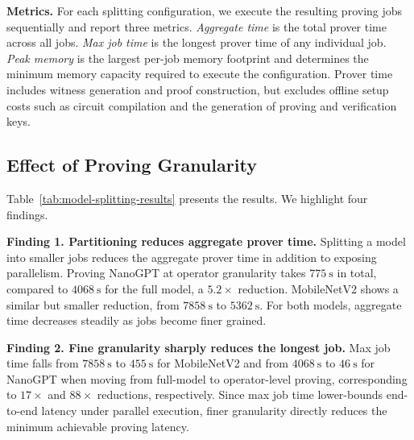 \noindent\textbf{Metrics.}
For each splitting configuration, we execute the resulting proving jobs sequentially and report three metrics. \textit{Aggregate time} is the total prover time across all jobs. \textit{Max job time} is the longest prover time of any individual job. \textit{Peak memory} is the largest per-job memory footprint and determines the minimum memory capacity required to execute the configuration. Prover time includes witness generation and proof construction, but excludes offline setup costs such as circuit compilation and the generation of proving and verification keys.
\subsection{Effect of Proving Granularity}

Table~\ref{tab:model-splitting-results} presents the
results. We highlight four findings.

\noindent\textbf{Finding 1. Partitioning reduces aggregate prover time.}
Splitting a model into smaller jobs reduces the aggregate prover time in
addition to exposing parallelism. Proving NanoGPT at operator granularity
takes \(\qty[quantity-product = {}]{775}{\second}\) in total, compared to
\(\qty[quantity-product = {}]{4068}{\second}\) for the full model, a
\(\num{5.2}\times\) reduction.
MobileNetV2 shows a similar but smaller reduction, from
\(\qty[quantity-product = {}]{7858}{\second}\) to
\(\qty[quantity-product = {}]{5362}{\second}\). For both models,
aggregate time decreases steadily as jobs become finer grained.








\noindent\textbf{Finding 2. Fine granularity sharply reduces the longest
job.}
Max job time falls from
\(\qty[quantity-product = {}]{7858}{\second}\) to
\(\qty[quantity-product = {}]{455}{\second}\) for MobileNetV2 and from
\(\qty[quantity-product = {}]{4068}{\second}\) to
\(\qty[quantity-product = {}]{46}{\second}\) for NanoGPT when moving from
full-model to operator-level proving, corresponding to
\(\num{17}\times\) and \(\num{88}\times\) reductions, respectively.
Since max job time lower-bounds end-to-end latency under parallel
execution, finer granularity directly reduces the minimum achievable
proving latency. 





